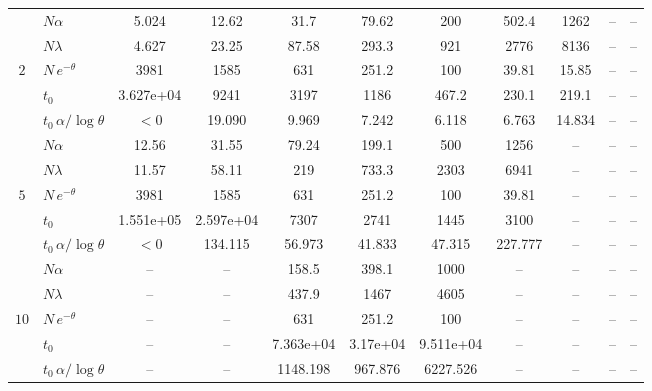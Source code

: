 \documentclass[10pt]{article}
\begin{document}
\begin{table}[t]
\begin{adjustbox}{max width=\textwidth, max totalheight=0.9\textheight, center}
\begin{tabular}{c lccccccccc}
\midrule
 & $N\alpha$ & 5.024 & 12.62 & 31.7 & 79.62 & 200 & 502.4 & 1262 & -- & -- \\
 & $N\lambda$ & 4.627 & 23.25 & 87.58 & 293.3 & 921 & 2776 & 8136 & -- & -- \\
$2$ & $N\,e^{-\theta}$ & 3981 & 1585 & 631 & 251.2 & 100 & 39.81 & 15.85 & -- & -- \\
 & $t_0$ & 3.627e+04 & 9241 & 3197 & 1186 & 467.2 & 230.1 & 219.1 & -- & -- \\
 & $t_0\,\alpha/\log\theta$ & $<0$ & 19.090 & 9.969 & 7.242 & 6.118 & 6.763 & 14.834 & -- & -- \\
\midrule
 & $N\alpha$ & 12.56 & 31.55 & 79.24 & 199.1 & 500 & 1256 & -- & -- & -- \\
 & $N\lambda$ & 11.57 & 58.11 & 219 & 733.3 & 2303 & 6941 & -- & -- & -- \\
$5$ & $N\,e^{-\theta}$ & 3981 & 1585 & 631 & 251.2 & 100 & 39.81 & -- & -- & -- \\
 & $t_0$ & 1.551e+05 & 2.597e+04 & 7307 & 2741 & 1445 & 3100 & -- & -- & -- \\
 & $t_0\,\alpha/\log\theta$ & $<0$ & 134.115 & 56.973 & 41.833 & 47.315 & 227.777 & -- & -- & -- \\
\midrule
 & $N\alpha$ & -- & -- & 158.5 & 398.1 & 1000 & -- & -- & -- & -- \\
 & $N\lambda$ & -- & -- & 437.9 & 1467 & 4605 & -- & -- & -- & -- \\
$10$ & $N\,e^{-\theta}$ & -- & -- & 631 & 251.2 & 100 & -- & -- & -- & -- \\
 & $t_0$ & -- & -- & 7.363e+04 & 3.17e+04 & 9.511e+04 & -- & -- & -- & -- \\
 & $t_0\,\alpha/\log\theta$ & -- & -- & 1148.198 & 967.876 & 6227.526 & -- & -- & -- & -- \\
\bottomrule
\end{tabular}
\end{adjustbox}
\end{table}
\end{document}
